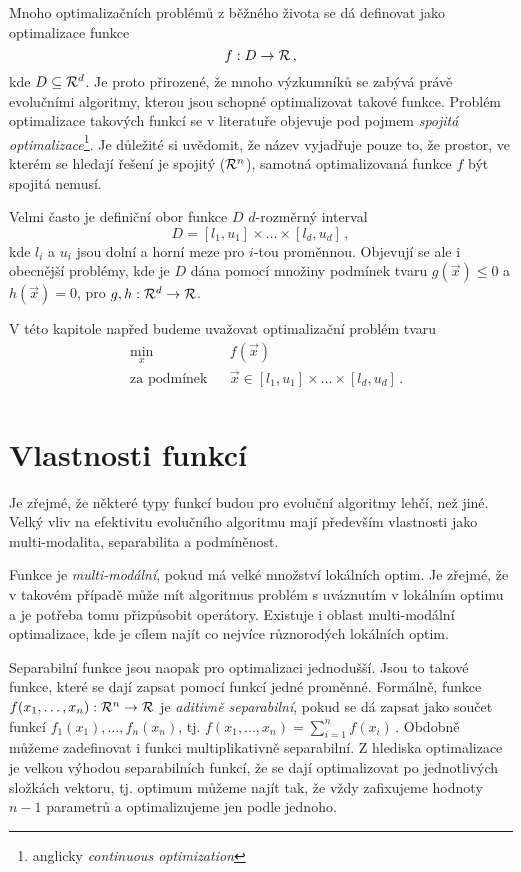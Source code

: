 
Mnoho optimalizačních problémů z běžného života se dá definovat jako optimalizace funkce $$f: D \to {\ensuremath{\mathcal{R}}}\,,$$ kde $D \subseteq {\ensuremath{\mathcal{R}}}^d$. Je proto přirozené, že mnoho výzkumníků se zabývá právě evolučními algoritmy, kterou jsou schopné optimalizovat takové funkce. Problém optimalizace takových funkcí se v literatuře objevuje pod pojmem \emph{spojitá optimalizace}\footnote{anglicky \emph{continuous optimization}}. Je důležité si uvědomit, že název
 vyjadřuje pouze to, že prostor, ve kterém se hledají řešení je spojitý (${\mathcal{R}}^n$), samotná optimalizovaná funkce $f$ být spojitá nemusí.

Velmi často je definiční obor funkce $D$ $d$-rozměrný interval $$D = [l_1, u_1] \times \dots \times [l_d, u_d]\,,$$ kde $l_i$ a $u_i$ jsou dolní a horní meze pro $i$-tou proměnnou. Objevují se ale i obecnější problémy, kde je $D$ dána pomocí množiny podmínek tvaru $g(\vec{x}) \leq 0$ a $h(\vec{x}) = 0$, pro $g, h: {\mathcal{R}}^d \to {\ensuremath{\mathcal{R}}}$.

V této kapitole napřed budeme uvažovat optimalizační problém tvaru 
\begin{equation*}
  \begin{aligned}
  & \underset{x}{\text{min}} & & f(\vec{x}) \\
  & \text{za podmínek} & & \vec{x} \in [l_1, u_1] \times \dots \times [l_d, u_d]\,. \\
  \end{aligned}
\end{equation*}

\section{Vlastnosti funkcí}

Je zřejmé, že některé typy funkcí budou pro evoluční algoritmy lehčí, než jiné. Velký vliv na efektivitu evolučního algoritmu mají především vlastnosti jako multi-modalita, separabilita a podmíněnost. 

Funkce je \emph{multi-modální}, pokud má velké množství lokálních optim. Je zřejmé, že v takovém případě může mít algoritmus problém s uváznutím v lokálním optimu a je potřeba tomu přizpůsobit operátory. Existuje i oblast multi-modální optimalizace, kde je cílem najít co nejvíce různorodých lokálních optim. 

Separabilní funkce jsou naopak pro optimalizaci jednodušší. Jsou to takové funkce, které se dají zapsat pomocí funkcí jedné proměnné. Formálně, funkce $f(x_1, \dots, x_n): {\mathcal{R}}^n \to {\ensuremath{\mathcal{R}}}$ je \emph{aditivně separabilní}, pokud se dá zapsat jako součet funkcí $f_1(x_1), \dots, f_n(x_n)$, tj. $f(x_1, \dots, x_n)= \sum_{i=1}^n f(x_i)\,.$ Obdobně můžeme zadefinovat i funkci multiplikativně separabilní. Z hlediska optimalizace je velkou výhodou separabilních funkcí, že se dají optimalizovat po jednotlivých složkách vektoru, tj. optimum můžeme najít tak, že vždy zafixujeme hodnoty $n-1$ parametrů a optimalizujeme jen podle jednoho.

